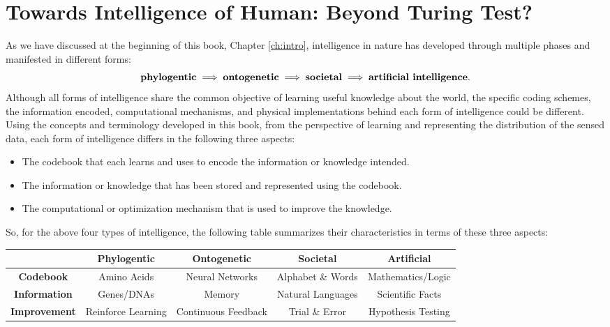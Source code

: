 \documentclass[../../book-main.tex]{subfiles}
\begin{document}
\section{Towards Intelligence of Human: Beyond Turing Test?}
As we have discussed at the beginning of this book, Chapter \ref{ch:intro}, intelligence in nature has developed through multiple phases and manifested in different forms:
\begin{equation}
\mbox{\textbf{phylogentic}} \;
   \Longrightarrow \; \mbox{\textbf{ontogenetic}} \; \Longrightarrow \; 
   \mbox{\textbf{societal}}
   \; \Longrightarrow \; 
   \mbox{\textbf{artificial intelligence}}.
\end{equation}
Although all forms of intelligence share the common objective of learning useful knowledge about the world, the specific coding schemes, the information encoded, computational mechanisms, and physical implementations behind each form of intelligence could be different. Using the concepts and terminology developed in this book, from the perspective of learning and representing the distribution of the sensed data, each form of intelligence differs in the following three aspects:
\begin{itemize}
    \item The codebook that each learns and uses to encode the information or knowledge intended.
    \item The information or knowledge that has been stored and represented using the codebook. 
    \item The computational or optimization mechanism that is used to improve the knowledge.
\end{itemize}
So, for the above four types of intelligence, the following table  summarizes their characteristics in terms of these three aspects:
\vspace{-2mm}
\begin{center}
\begin{tabular}{| c | c | c | c | c |}
\hline & \textbf{Phylogentic} & \textbf{Ontogenetic} & \textbf{Societal} & \textbf{Artificial}\\
\hline
\textbf{Codebook}  & Amino Acids & Neural Networks & Alphabet \& Words & Mathematics/Logic \\ [0.5ex]
  \hline 
\textbf{Information} & Genes/DNAs & Memory & Natural Languages & Scientific Facts\\ [0.5ex]
  \hline
\textbf{Improvement} & Reinforce Learning & Continuous Feedback & Trial \& Error & Hypothesis Testing \\  [0.5ex]
\hline
\end{tabular}
\end{center}
\end{document}
